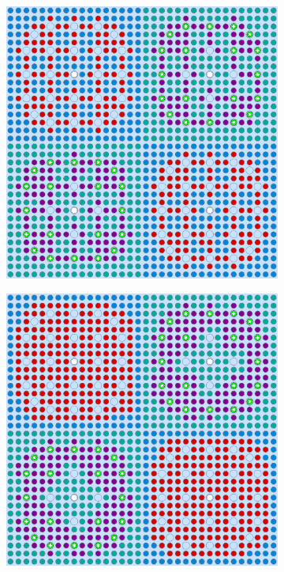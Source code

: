 \begin{appendices}
\begin{figure}[h!]
\centering
\begin{subfigure}{0.48\textwidth}
  \centering
  \includegraphics[width=0.85\linewidth]{figures/unsupervised/geometries/without-features/2-clusters/pinch/2x2}
  \caption{}
  \label{fig:no-features-2x2-pinch-2}
\end{subfigure}%
\begin{subfigure}{0.48\textwidth}
  \centering
  \includegraphics[width=0.85\linewidth]{figures/unsupervised/geometries/without-features/2-clusters/combined/2x2}

\end{subfigure}
\end{figure}
\end{appendices}
